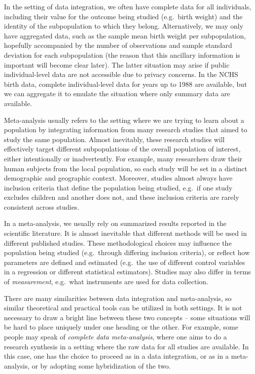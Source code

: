 In the setting of data integration, we often have complete data for all individuals, including their value for the outcome being studied (e.g.\ birth weight) and the identity of the subpopulation to which they belong. Alternatively, we may only have aggregated data, such as the sample mean birth weight per subpopulation, hopefully accompanied by the number of observations and sample standard deviation for each subpopulation (the reason that this ancillary information is important will become clear later). The latter situation may arise if public individual-level data are not accessible due to privacy concerns. In the NCHS birth data, complete individual-level data for years up to 1988 are available, but we can aggregate it to emulate the situation where only summary data are available.

Meta-analysis usually refers to the setting where we are trying to learn about a population by integrating information from many research studies that aimed to study the same population. Almost inevitably, these research studies will effectively target different subpopulations of the overall population of interest, either intentionally or inadvertently. For example, many researchers draw their human subjects from the local population, so each study will be set in a distinct demographic and geographic context. Moreover, studies almost always have inclusion criteria that define the population being studied, e.g.\ if one study excludes children and another does not, and these inclusion criteria are rarely consistent across studies.

In a meta-analysis, we usually rely on summarized results reported in the scientific literature. It is almost inevitable that different methods will be used in different published studies. These methodological choices may influence the population being studied (e.g.\ through differing inclusion criteria), or reflect how parameters are defined and estimated (e.g.\ the use of different control variables in a regression or different statistical estimators). Studies may also differ in terms of {\em measurement}, e.g.\ what instruments are used for data collection.

There are many similarities between data integration and meta-analysis, so similar theoretical and practical tools can be utilized in both settings.  It is not necessary to draw a bright line between these two concepts -- some situations will be hard to place uniquely under one heading or the other. For example, some people may speak of \textit{complete data meta-analysis}, where one aims to do a research synthesis in a setting where the raw data for all studies are available. In this case, one has the choice to proceed as in a data integration, or as in a meta-analysis, or by adopting some hybridization of the two.

